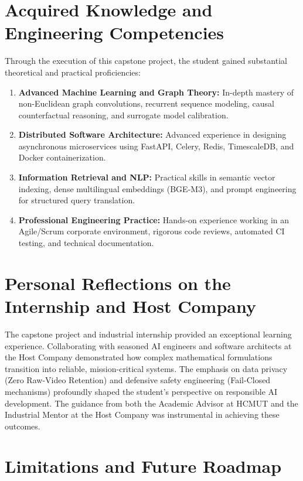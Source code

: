 \section{Acquired Knowledge and Engineering Competencies}
Through the execution of this capstone project, the student gained substantial theoretical and practical proficiencies:
\begin{enumerate}[leftmargin=1.5cm, label=\textbf{\arabic*.}]
  \item \textbf{Advanced Machine Learning and Graph Theory:} In-depth mastery of non-Euclidean graph convolutions, recurrent sequence modeling, causal counterfactual reasoning, and surrogate model calibration.
  \item \textbf{Distributed Software Architecture:} Advanced experience in designing asynchronous microservices using FastAPI, Celery, Redis, TimescaleDB, and Docker containerization.
  \item \textbf{Information Retrieval and NLP:} Practical skills in semantic vector indexing, dense multilingual embeddings (BGE-M3), and prompt engineering for structured query translation.
  \item \textbf{Professional Engineering Practice:} Hands-on experience working in an Agile/Scrum corporate environment, rigorous code reviews, automated CI testing, and technical documentation.
\end{enumerate}

\section{Personal Reflections on the Internship and Host Company}
The capstone project and industrial internship provided an exceptional learning experience. Collaborating with seasoned AI engineers and software architects at the Host Company demonstrated how complex mathematical formulations transition into reliable, mission-critical systems. The emphasis on data privacy (Zero Raw-Video Retention) and defensive safety engineering (Fail-Closed mechanisms) profoundly shaped the student's perspective on responsible AI development. The guidance from both the Academic Advisor at HCMUT and the Industrial Mentor at the Host Company was instrumental in achieving these outcomes.

\section{Limitations and Future Roadmap}
